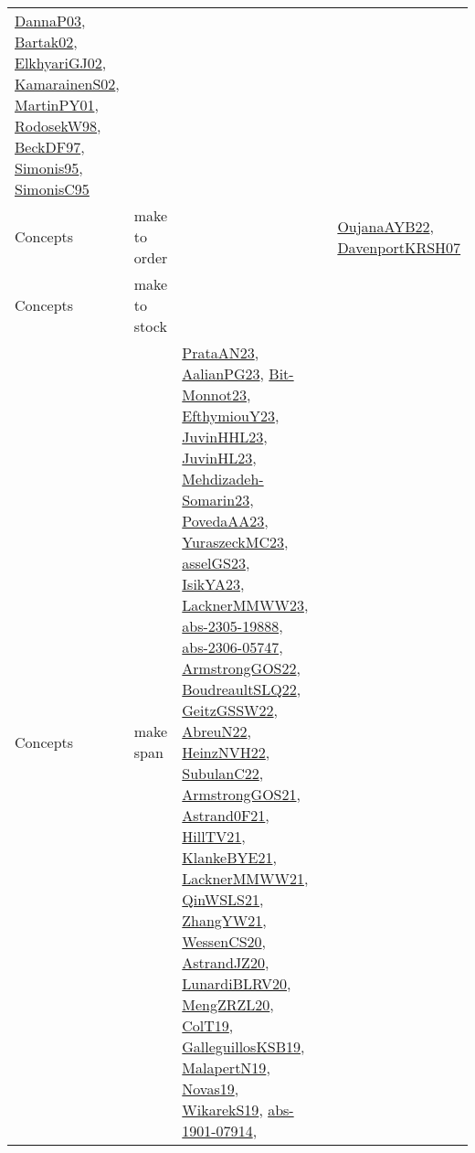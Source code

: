 {\begin{longtable}{llp{6cm}p{6cm}p{6cm}}
\href{papers/DannaP03.pdf}{DannaP03}\cite{DannaP03}, \href{papers/Bartak02.pdf}{Bartak02}\cite{Bartak02}, \href{papers/ElkhyariGJ02.pdf}{ElkhyariGJ02}\cite{ElkhyariGJ02}, \href{papers/KamarainenS02.pdf}{KamarainenS02}\cite{KamarainenS02}, \href{articles/MartinPY01.pdf}{MartinPY01}\cite{MartinPY01}, \href{papers/RodosekW98.pdf}{RodosekW98}\cite{RodosekW98}, \href{papers/BeckDF97.pdf}{BeckDF97}\cite{BeckDF97}, \href{papers/Simonis95.pdf}{Simonis95}\cite{Simonis95}, \href{papers/SimonisC95.pdf}{SimonisC95}\cite{SimonisC95}\\
Concepts & make to order &  &  & \href{papers/OujanaAYB22.pdf}{OujanaAYB22}\cite{OujanaAYB22}, \href{papers/DavenportKRSH07.pdf}{DavenportKRSH07}\cite{DavenportKRSH07}\\
Concepts & make to stock &  &  & \\
Concepts & make span & \href{articles/PrataAN23.pdf}{PrataAN23}\cite{PrataAN23}, \href{papers/AalianPG23.pdf}{AalianPG23}\cite{AalianPG23}, \href{papers/Bit-Monnot23.pdf}{Bit-Monnot23}\cite{Bit-Monnot23}, \href{papers/EfthymiouY23.pdf}{EfthymiouY23}\cite{EfthymiouY23}, \href{papers/JuvinHHL23.pdf}{JuvinHHL23}\cite{JuvinHHL23}, \href{papers/JuvinHL23.pdf}{JuvinHL23}\cite{JuvinHL23}, \href{papers/Mehdizadeh-Somarin23.pdf}{Mehdizadeh-Somarin23}\cite{Mehdizadeh-Somarin23}, \href{papers/PovedaAA23.pdf}{PovedaAA23}\cite{PovedaAA23}, \href{papers/YuraszeckMC23.pdf}{YuraszeckMC23}\cite{YuraszeckMC23}, \href{papers/asselGS23.pdf}{asselGS23}\cite{asselGS23}, \href{articles/IsikYA23.pdf}{IsikYA23}\cite{IsikYA23}, \href{articles/LacknerMMWW23.pdf}{LacknerMMWW23}\cite{LacknerMMWW23}, \href{articles/abs-2305-19888.pdf}{abs-2305-19888}\cite{abs-2305-19888}, \href{articles/abs-2306-05747.pdf}{abs-2306-05747}\cite{abs-2306-05747}, \href{papers/ArmstrongGOS22.pdf}{ArmstrongGOS22}\cite{ArmstrongGOS22}, \href{papers/BoudreaultSLQ22.pdf}{BoudreaultSLQ22}\cite{BoudreaultSLQ22}, \href{papers/GeitzGSSW22.pdf}{GeitzGSSW22}\cite{GeitzGSSW22}, \href{articles/AbreuN22.pdf}{AbreuN22}\cite{AbreuN22}, \href{articles/HeinzNVH22.pdf}{HeinzNVH22}\cite{HeinzNVH22}, \href{articles/SubulanC22.pdf}{SubulanC22}\cite{SubulanC22}, \href{papers/ArmstrongGOS21.pdf}{ArmstrongGOS21}\cite{ArmstrongGOS21}, \href{papers/Astrand0F21.pdf}{Astrand0F21}\cite{Astrand0F21}, \href{papers/HillTV21.pdf}{HillTV21}\cite{HillTV21}, \href{papers/KlankeBYE21.pdf}{KlankeBYE21}\cite{KlankeBYE21}, \href{papers/LacknerMMWW21.pdf}{LacknerMMWW21}\cite{LacknerMMWW21}, \href{articles/QinWSLS21.pdf}{QinWSLS21}\cite{QinWSLS21}, \href{articles/ZhangYW21.pdf}{ZhangYW21}\cite{ZhangYW21}, \href{papers/WessenCS20.pdf}{WessenCS20}\cite{WessenCS20}, \href{articles/AstrandJZ20.pdf}{AstrandJZ20}\cite{AstrandJZ20}, \href{articles/LunardiBLRV20.pdf}{LunardiBLRV20}\cite{LunardiBLRV20}, \href{articles/MengZRZL20.pdf}{MengZRZL20}\cite{MengZRZL20}, \href{papers/ColT19.pdf}{ColT19}\cite{ColT19}, \href{papers/GalleguillosKSB19.pdf}{GalleguillosKSB19}\cite{GalleguillosKSB19}, \href{papers/MalapertN19.pdf}{MalapertN19}\cite{MalapertN19}, \href{articles/Novas19.pdf}{Novas19}\cite{Novas19}, \href{articles/WikarekS19.pdf}{WikarekS19}\cite{WikarekS19}, \href{articles/abs-1901-07914.pdf}{abs-1901-07914}\cite{abs-1901-07914}, 
\end{longtable}}
